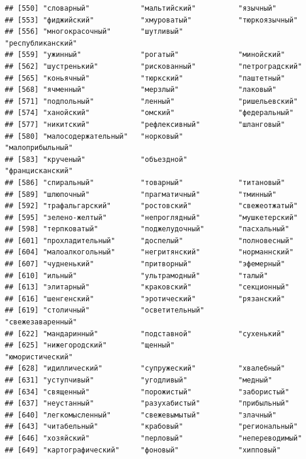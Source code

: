 \documentclass[11pt]{article}\usepackage[]{graphicx}\usepackage[]{color}
\makeatletter
\newenvironment{kframe}{%
 \def\at@end@of@kframe{}%
 \ifinner\ifhmode%
  \def\at@end@of@kframe{\end{minipage}}%
  \begin{minipage}{\columnwidth}%
 \fi\fi%
 \def\FrameCommand##1{\hskip\@totalleftmargin \hskip-\fboxsep
 \colorbox{shadecolor}{##1}\hskip-\fboxsep
     \hskip-\linewidth \hskip-\@totalleftmargin \hskip\columnwidth}%
 \MakeFramed {\advance\hsize-\width
   \@totalleftmargin\z@ \linewidth\hsize
   \@setminipage}}%
 {\par\unskip\endMakeFramed%
 \at@end@of@kframe}
\newenvironment{knitrout}{}{} %
\makeatother
\begin{document}
\begin{knitrout}
\begin{kframe}
\begin{verbatim}
## [550] "словарный"            "мальтийский"          "язычный"             
## [553] "фиджийский"           "хмуроватый"           "тюркоязычный"        
## [556] "многокрасочный"       "шутливый"             "республиканский"     
## [559] "ужинный"              "рогатый"              "минойский"           
## [562] "шустренький"          "рискованный"          "петроградский"       
## [565] "коньячный"            "тюркский"             "паштетный"           
## [568] "ячменный"             "мерзлый"              "лаковый"             
## [571] "подпольный"           "ленный"               "ришельевский"        
## [574] "ханойский"            "омский"               "федеральный"         
## [577] "никитский"            "рефлексивный"         "шланговый"           
## [580] "малосодержательный"   "норковый"             "малоприбыльный"      
## [583] "крученый"             "объездной"            "францисканский"      
## [586] "спиральный"           "товарный"             "титановый"           
## [589] "шлюпочный"            "прагматичный"         "тминный"             
## [592] "трафальгарский"       "ростовский"           "свежеотжатый"        
## [595] "зелено-желтый"        "непроглядный"         "мушкетерский"        
## [598] "терпковатый"          "поджелудочный"        "пасхальный"          
## [601] "прохладительный"      "доспелый"             "полновесный"         
## [604] "малоалкогольный"      "негритянский"         "норманнский"         
## [607] "чудненький"           "притворный"           "эфемерный"           
## [610] "ильный"               "ультрамодный"         "талый"               
## [613] "элитарный"            "краковский"           "секционный"          
## [616] "шенгенский"           "эротический"          "рязанский"           
## [619] "столичный"            "осветительный"        "свежезаваренный"     
## [622] "мандаринный"          "подставной"           "сухенький"           
## [625] "нижегородский"        "щенный"               "юмористический"      
## [628] "идиллический"         "супружеский"          "хвалебный"           
## [631] "уступчивый"           "угодливый"            "медный"              
## [634] "священный"            "порожистый"           "забористый"          
## [637] "неустанный"           "разухабистый"         "прибыльный"          
## [640] "легкомысленный"       "свежевымытый"         "злачный"             
## [643] "читабельный"          "крабовый"             "региональный"        
## [646] "хозяйский"            "перловый"             "непереводимый"       
## [649] "картографический"     "фоновый"              "хипповый"            

\end{verbatim}
\end{kframe}
\end{knitrout}
\end{document}
